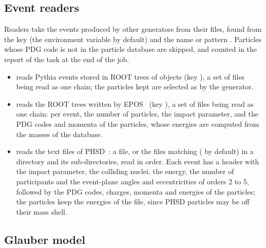 \subsection{Event readers}
\label{sec:readers}

Readers take the events produced by other generators from their files, found from the key 
(the environment variable  by default) and the name or pattern .
Particles whose PDG code is not in the particle database are skipped, and counted in the report of the task at the
end of the job.
\begin{itemize}
  \item {} reads Pythia events stored in ROOT trees of  objects (key
  ), a set of files being read as one chain; the particles kept are selected as by the generator.
  \item {} reads the ROOT trees written by EPOS~\cite{Werner:2010aa} (key ), a set
  of files being read as one chain: per event, the number of particles, the impact parameter, and the PDG codes and
  momenta of the particles, whose energies are computed from the masses of the database.
  \item {} reads the text files of PHSD~\cite{Cassing:2009vt}: a file, or the files matching
   ( by default) in a directory and its sub-directories, read in order. Each event
  has a header with the impact parameter, the colliding nuclei, the energy, the number of participants and the
  event-plane angles and eccentricities of orders 2 to 5, followed by the PDG codes, charges, momenta and energies of
  the particles; the particles keep the energies of the file, since PHSD particles may be off their mass shell.
\end{itemize}

\subsection{Glauber model}
\label{sec:glauber}

